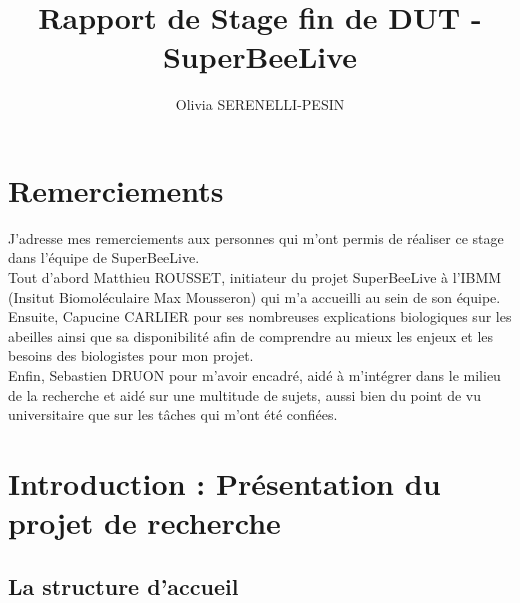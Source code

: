 \documentclass[11pt,french,a4paper]{report}
\title{Rapport de Stage fin de DUT - SuperBeeLive}
\author{Olivia SERENELLI-PESIN}
\begin{document}
\maketitle

\clearpage
\newpage 

\chapter*{Remerciements}

J’adresse mes remerciements aux personnes qui m’ont permis de réaliser ce stage dans l’équipe de SuperBeeLive. \\
Tout d’abord Matthieu ROUSSET, initiateur du projet SuperBeeLive à l'IBMM (Insitut Biomoléculaire Max Mousseron) 
qui m’a accueilli au sein de son équipe. \\
Ensuite, Capucine CARLIER pour ses nombreuses explications biologiques sur les abeilles ainsi que sa disponibilité 
afin de comprendre au mieux les enjeux et les besoins des biologistes pour mon projet. \\
Enfin, Sebastien DRUON pour m’avoir encadré, aidé à m’intégrer dans le milieu de la recherche et aidé sur une multitude 
de sujets, aussi bien du point de vu universitaire que sur les tâches qui m’ont été confiées. \\

\tableofcontents

\clearpage

\chapter{Introduction : Présentation du projet de recherche}
\section{La structure d'accueil} 
\end{document}
